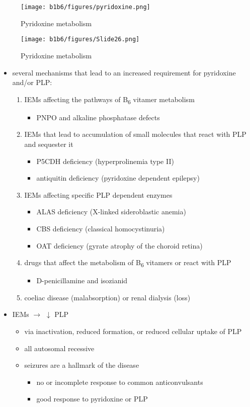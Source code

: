 \documentclass{scrartcl}
\begin{document}
\begin{figure}[htbp]
\centering
\texttt{[image: b1b6/figures/pyridoxine.png]}
\caption{\label{fig:org3639a1d}Pyridoxine metabolism}
\end{figure}

\begin{figure}[htbp]
\centering
\texttt{[image: b1b6/figures/Slide26.png]}
\caption{\label{fig:org098869c}Pyridoxine metabolism}
\end{figure}

\begin{itemize}
\item several mechanisms that lead to an increased requirement for
pyridoxine and/or PLP:
\begin{enumerate}
\item IEMs affecting the pathways of B\textsubscript{6} vitamer metabolism
\begin{itemize}
\item PNPO and alkaline phosphatase defects
\end{itemize}
\item IEMs that lead to accumulation of small molecules that
react with PLP and sequester it
\begin{itemize}
\item P5CDH deficiency (hyperprolinemia type II)
\item antiquitin deficiency (pyridoxine dependent epilepsy)
\end{itemize}
\item IEMs affecting specific PLP dependent enzymes
\begin{itemize}
\item ALAS deficiency (X-linked sideroblastic anemia)
\item CBS deficiency (classical homocystinuria)
\item OAT deficiency (gyrate atrophy of the choroid retina)
\end{itemize}
\item drugs that affect the metabolism of B\textsubscript{6} vitamers or react with PLP
\begin{itemize}
\item D-penicillamine and isozianid
\end{itemize}
\item coeliac disease (malabsorption) or renal dialysis (loss)
\end{enumerate}
\item IEMs \(\to\) \(\downarrow\) PLP
\begin{itemize}
\item via inactivation, reduced formation, or reduced cellular uptake of
PLP
\item all autosomal recessive
\item seizures are a hallmark of the disease
\begin{itemize}
\item no or incomplete response to common anticonvulsants
\item good response to pyridoxine or PLP
\end{itemize}
\end{itemize}
\end{itemize}
\end{document}
